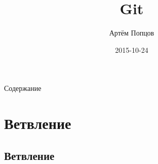 \documentclass[presentation]{beamer}
\author{Артём Попцов}
\date{2015-10-24}
\title{Git}
\begin{document}
\maketitle



\begin{frame}{Содержание}
  \setcounter{tocdepth}{1}
  \tableofcontents
\end{frame}



\section{Ветвление}

\subsection{Ветвление}
\end{document}

